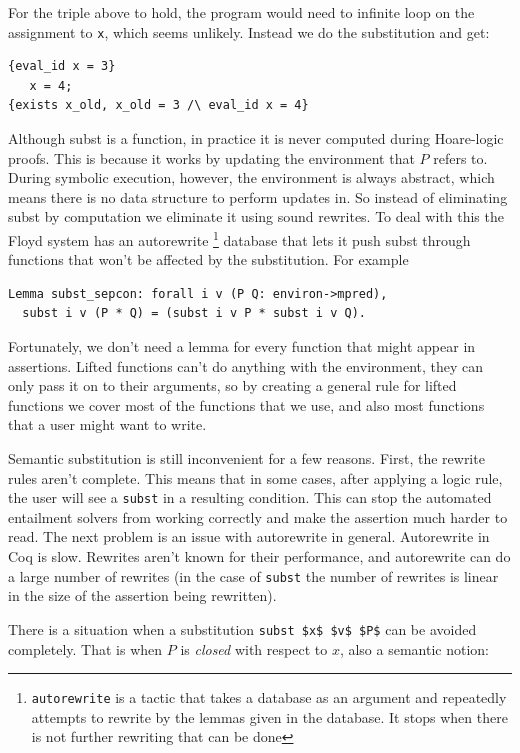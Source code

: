 \documentclass{puthesis}
\begin{document}
For the triple above to hold, the program would need to infinite loop
on the assignment to \lstinline|x|, which seems unlikely. Instead we
do the substitution and get:

\begin{verbatim}
{eval_id x = 3}
   x = 4;
{exists x_old, x_old = 3 /\ eval_id x = 4}
\end{verbatim}


Although subst is a function, in practice it is never computed during
Hoare-logic proofs.
This is because it works by updating the environment that $P$ refers
to. During symbolic execution, however, the environment is always
abstract, which means there is
no data structure to perform updates in. So instead of eliminating
subst by computation we eliminate it using sound rewrites. 
To deal with this the Floyd
system has an autorewrite
\footnote{\lstinline|autorewrite| is a tactic
  that takes a database as an argument and repeatedly attempts to
  rewrite by the lemmas given in the database. It stops when there is
  not further rewriting that can be done}
database that lets it push subst through
functions that won't be affected by the substitution. For example

\begin{verbatim}
Lemma subst_sepcon: forall i v (P Q: environ->mpred),
  subst i v (P * Q) = (subst i v P * subst i v Q).
\end{verbatim}

Fortunately, we don't need a lemma for every function that might
appear in assertions. Lifted functions can't do anything with the
environment, they can only pass it on to their arguments, so
by creating a general rule for lifted functions we cover
most of the functions that we use, and also most functions
that a user might want to write. 

Semantic substitution is still inconvenient for a few reasons. First,
the rewrite rules aren't complete. This means that in some cases, after
applying a logic rule, the user will see a \lstinline|subst| in a
resulting condition. This can stop the automated entailment
solvers from working correctly and make the assertion much harder
to read. The next problem is an issue with autorewrite in general.
Autorewrite in Coq is slow. Rewrites aren't known for their 
performance, and autorewrite can do a large number of rewrites
(in the case of \lstinline|subst| the number of rewrites is
linear in the size of the assertion being rewritten). 

There is a situation when a substitution \lstinline|subst $x$ $v$ $P$| can
be avoided completely. That is when $P$ is \emph{closed} with respect to 
$x$, also a semantic notion:
\end{document}
